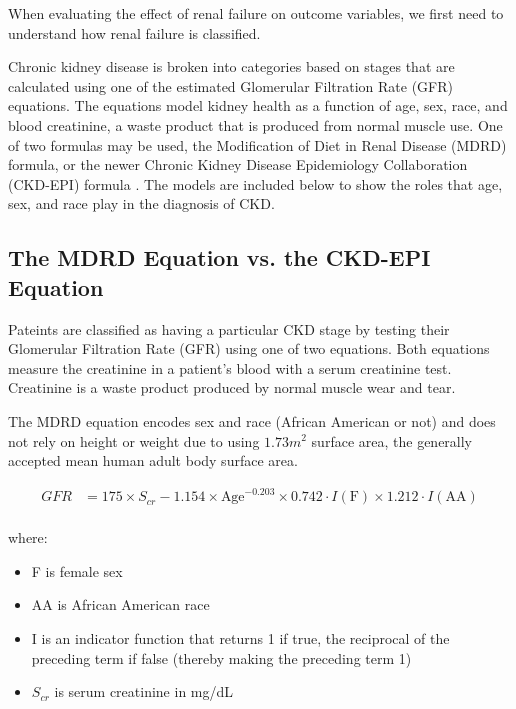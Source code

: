 When evaluating the effect of renal failure on outcome variables, we first need to understand how renal failure is classified.

Chronic kidney disease is broken into categories based on stages that are calculated using one of the estimated Glomerular Filtration Rate
(GFR) equations. The equations model kidney health as a function of age, sex, race, and blood creatinine, a waste product that is produced from
normal muscle use. One of two formulas may be used, the Modification of Diet in Renal Disease (MDRD) formula, or the newer
Chronic Kidney Disease Epidemiology Collaboration (CKD-EPI) formula \cite{eGFR2018}. The models are included below to show the roles that
age, sex, and race play in the diagnosis of CKD.

\subsection{The MDRD Equation vs. the CKD-EPI Equation}

Pateints are classified as having a particular CKD stage by testing their Glomerular Filtration Rate (GFR) using one of two equations.
Both equations measure the creatinine in a patient's blood with a serum creatinine test. Creatinine is a waste product produced by normal
muscle wear and tear. 

The MDRD equation encodes sex and race (African American or not) and does not rely on height or weight due to using $1.73m^2$ surface area,
the generally accepted mean human adult body surface area. 

\begin{equation} \label{mdrd}
\begin{split}
  GFR  &= 175 \times S_{cr} - 1.154 \times \text{Age}^{-0.203} \times 0.742 \cdot I(\text{F}) \times 1.212 \cdot I(\text{AA}) \\
\end{split}
\end{equation}

where:
\begin{itemize}
  \item F is female sex
  \item AA is African American race
  \item I is an indicator function that returns 1 if true, the reciprocal of the preceding term if false (thereby making the preceding term 1)
  \item $S_{cr}$ is serum creatinine in mg/dL
\end{itemize} \cite{Levey1999}

